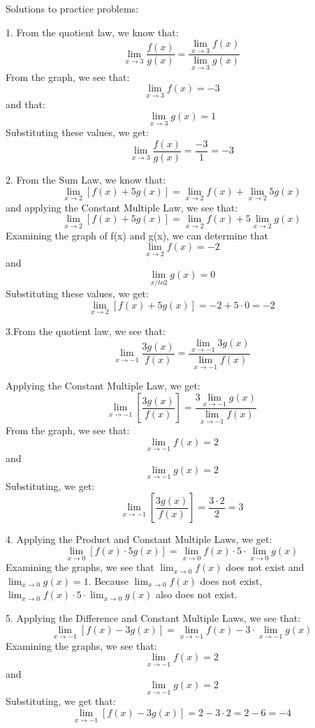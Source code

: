 Solutions to practice problems:

1. From the quotient law, we know that:$$\lim_{x\to3}\frac{f(x)}{g(x)}=\frac{\lim_{x\to3}f(x)}{\lim_{x\to3}g(x)}$$
From the graph, we see that: $$\lim_{x\to3}f(x) = -3$$
and that:$$\lim_{x\to3}g(x) = 1$$
Substituting these values, we get:
$$\lim_{x\to3}\frac{f(x)}{g(x)}=\frac{-3}{1} = -3$$


2. From the Sum Law, we know that: $$\lim_{x\to2}\left[f(x) + 5g(x)\right]=\lim_{x\to2}f(x) + \lim_{x\to2}5g(x)$$
and applying the Constant Multiple Law, we see that:
$$\lim_{x\to2}\left[f(x) + 5g(x)\right]=\lim_{x\to2}f(x) + 5\lim_{x\to2}g(x)$$
Examining the graph of f(x) and g(x), we can determine that $$\lim_{x\to2}f(x) = -2$$
and
$$\lim_{x/to2}g(x) = 0$$
Substituting these values, we get:
$$\lim_{x\to2}\left[f(x) + 5g(x)\right]=-2 + 5 \cdot 0 = -2$$


3.From the quotient law, we see that: $$\lim_{x\to-1} \frac{3g(x)}{f(x)}=\frac{\lim_{x\to-1}3g(x)}{\lim_{x\to-1}f(x)}$$

Applying the Constant Multiple Law, we get:
$$\lim_{x\to-1} \left[\frac{3g(x)}{f(x)}\right]=\frac{3\lim_{x\to-1}g(x)}{\lim_{x\to-1}f(x)}$$
From the graph, we see that:
$$\lim_{x\to-1}f(x) = 2$$
and
$$\lim_{x\to-1}g(x) = 2$$
Substituting, we get:
$$\lim_{x\to-1} \left[\frac{3g(x)}{f(x)}\right]=\frac{3 \cdot 2}{2}=3$$

4. Applying the Product and Constant Multiple Laws, we get:
$$\lim_{x\to0}\left[f(x) \cdot 5g(x)\right] = \lim_{x\to0}f(x) \cdot 5 \cdot \lim_{x\to0}g(x)$$
Examining the graphs, we see that $\lim_{x\to0}f(x)$ does not exist and $\lim_{x\to0}g(x) = 1$. Because $\lim_{x\to0}f(x)$ does not exist, $\lim_{x\to0}f(x) \cdot 5 \cdot \lim_{x\to0}g(x)$ also does not exist. 

5. Applying the Difference and Constant Multiple Laws, we see that:
$$\lim_{x\to-1} \left[f(x) - 3g(x)\right] =\lim_{x\to-1}f(x) - 3 \cdot \lim_{x\to-1}g(x)$$
Examining the graphs, we see that:
$$\lim_{x\to-1}f(x) = 2$$
and
$$\lim_{x\to-1}g(x) = 2$$
Substituting, we get that:
$$\lim_{x\to-1} \left[f(x) - 3g(x)\right] =2 - 3 \cdot 2 = 2-6 = -4$$


